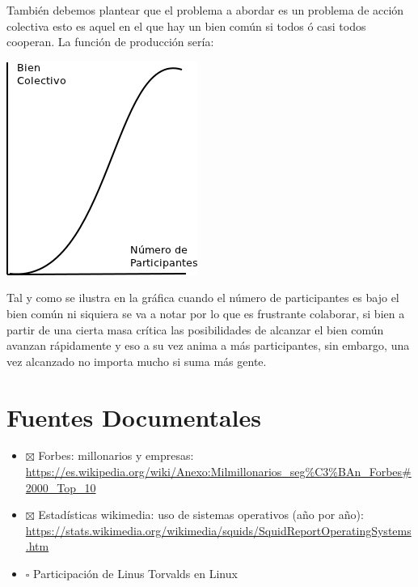 \documentclass[11pt]{article}
\begin{document}
También debemos plantear que el problema a abordar es un problema de
acción colectiva esto es aquel en el que hay un bien común si todos ó casi
todos cooperan. La función de producción sería:

\includegraphics[width=.9\linewidth]{accion-colectiva.png}

Tal y como se ilustra en la gráfica cuando el número de participantes
es bajo el bien común ni siquiera se va a notar por lo que es
frustrante colaborar, si bien a partir de una cierta masa crítica las
posibilidades de alcanzar el bien común avanzan rápidamente y eso a su
vez anima a más participantes, sin embargo, una vez alcanzado no
importa mucho si suma más gente.

\section{Fuentes Documentales}
\label{sec-3}

\begin{itemize}
\item $\boxtimes$ Forbes: millonarios y empresas: \url{https://es.wikipedia.org/wiki/Anexo:Milmillonarios_seg\%C3\%BAn_Forbes#2000_Top_10}
\item $\boxtimes$ Estadísticas wikimedia: uso de sistemas operativos (año por año): \url{https://stats.wikimedia.org/wikimedia/squids/SquidReportOperatingSystems.htm}
\item $\square$ Participación de Linus Torvalds en Linux
\end{itemize}
\end{document}
